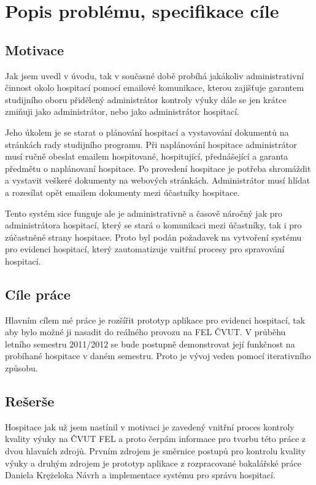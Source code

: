 \chapter{Popis problému, specifikace cíle}
\section{Motivace}
Jak jsem uvedl v úvodu, tak v současné době probíhá jakákoliv administrativní činnost okolo hospitací pomocí emailové komunikace, kterou zajišťuje garantem studijního oboru přidělený administrátor kontroly výuky dále se jen krátce zmiňuji jako administrátor, nebo jako administrátor hospitací. 

Jeho úkolem je se starat o plánování hospitací a vystavování dokumentů na stránkách rady studijního programu. Při naplánování hospitace administrátor musí ručně obeslat emailem hospitované, hospitující, přednášející a garanta předmětu o naplánovaní hospitace. Po provedení hospitace je potřeba shromáždit a vystavit veškeré dokumenty na webových stránkách. Administrátor musí hlídat a rozesílat opět emailem dokumenty mezi účastníky hospitace.

Tento systém sice funguje ale je administrativně a časově náročný jak pro administrátora hospitací, který se stará o komunikaci mezi účastníky, tak i pro zúčastněné strany hospitace. Proto byl podán požadavek na vytvoření systému pro evidenci hospitací, který zautomatizuje vnitřní procesy pro spravování hospitací.

\section{Cíle práce}
Hlavním cílem mé práce je rozšířit prototyp aplikace pro evidenci hospitací, tak aby bylo možné ji nasadit do reálného provozu na FEL ČVUT. V průběhu letního semestru 2011/2012 se bude postupně demonstrovat její funkčnost na probíhané hospitace v daném semestru. Proto je vývoj veden pomocí iterativního způsobu.

\section{Rešerše}
Hospitace jak už jsem nastínil v motivaci je zavedený vnitřní proces kontroly kvality výuky na ČVUT FEL a proto čerpám informace pro tvorbu této práce z dvou hlavních zdrojů. Prvním zdrojem je směrnice postupů pro kontrolu kvality výuky a druhým zdrojem je prototyp aplikace z rozpracované bakalářské práce Daniela Krężeloka Návrh a implementace systému pro správu hospitací.

